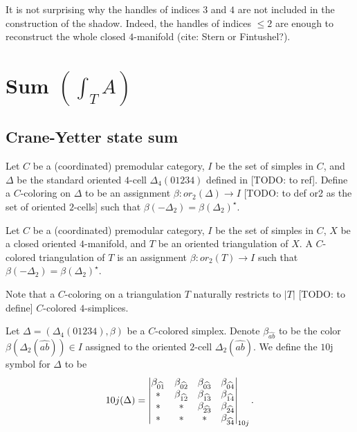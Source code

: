 \begin{remark}
  It is not surprising why the handles of indices $3$ and $4$ are
  not included in the construction of the shadow. Indeed, the
  handles of indices $\leq 2$ are enough to reconstruct the whole
  closed $4$-manifold (cite: Stern or Fintushel?).
\end{remark}

\section{Sum $\left( \int_{T}{A} \right)$}
\subsection{Crane-Yetter state sum}

\begin{definition}\label{def/C-colored-simplex}
  Let $C$ be a (coordinated) premodular category, $I$ be the set
  of simples in $C$, and $\Delta$ be the standard oriented
  $4$-cell $\Delta_{4}(01234)$ defined in [TODO: to ref]. Define
  a $C$-coloring on $\Delta$ to be an assignment
  $\beta: or_{2}(\Delta) \to I$ [TODO: to def or2 as the set of
  oriented $2$-cells] such that
  $\beta(-\Delta_{2}) = \beta(\Delta_{2})^{\star}$.
\end{definition}

\begin{definition}\label{def/C-colored-triangulation}
  Let $C$ be a (coordinated) premodular category, $I$ be the set
  of simples in $C$, $X$ be a closed oriented $4$-manifold, and
  $T$ be an oriented triangulation of $X$. A $C$-colored
  triangulation of $T$ is an assignment $\beta: or_{2}(T) \to I$
  such that $\beta(-\Delta_{2}) = \beta(\Delta_{2})^{\star}$.
\end{definition}

\noindent Note that a $C$-coloring on a triangulation $T$
naturally restricts to $|T|$ [TODO: to define] $C$-colored
$4$-simplices.

\begin{definition}\label{def/10j-symbol-for-a-C-colored-simplex}
  Let $\Delta = (\Delta_{4}(01234), \beta)$ be a $C$-colored
  simplex. Denote $\beta_{\widehat{ab}}$ to be the color
  $\beta(\Delta_{2}(\widehat{ab})) \in I$ assigned to the
  oriented $2$-cell $\Delta_{2}(\widehat{ab})$. We define the
  $10$j symbol for $\Delta$ to be
  $$
  10j(\Delta) =
  \begin{vmatrix} \beta_{\widehat{01}} & \beta_{\widehat{02}} & \beta_{\widehat{03}} & \beta_{\widehat{04}} \\ * & \beta_{\widehat{12}} & \beta_{\widehat{13}} & \beta_{\widehat{14}} \\ * & * & \beta_{\widehat{23}} & \beta_{\widehat{24}} \\ * & * & * & \beta_{\widehat{34}} \\ \end{vmatrix}_{10j}.
  $$
\end{definition}

